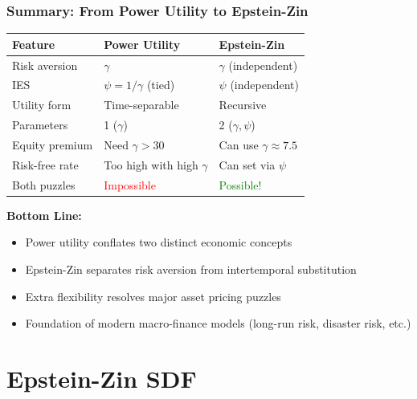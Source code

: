 \documentclass{beamer}
\begin{document}
\begin{frame}
    \frametitle{Summary: From Power Utility to Epstein-Zin}
    
    \begin{table}
        \footnotesize
        \begin{tabular}{p{3cm}|p{3.5cm}|p{3.5cm}}
            \toprule
            \textbf{Feature} & \textbf{Power Utility} & \textbf{Epstein-Zin} \\
            \midrule
            Risk aversion & $\gamma$ & $\gamma$ (independent) \\[0.2cm]
            IES & $\psi = 1/\gamma$ (tied) & $\psi$ (independent) \\[0.2cm]
            Utility form & Time-separable & Recursive \\[0.2cm]
            Parameters & 1 ($\gamma$) & 2 ($\gamma, \psi$) \\[0.2cm]
            Equity premium & Need $\gamma > 30$ & Can use $\gamma \approx 7.5$ \\[0.2cm]
            Risk-free rate & Too high with high $\gamma$ & Can set via $\psi$ \\[0.2cm]
            Both puzzles & \textcolor{red}{Impossible} & \textcolor{green}{Possible!} \\
            \bottomrule
        \end{tabular}
    \end{table}
    
    
    \textbf{Bottom Line:}
    \begin{itemize}
        \item Power utility conflates two distinct economic concepts
        \item Epstein-Zin separates risk aversion from intertemporal substitution
        \item Extra flexibility resolves major asset pricing puzzles
        \item Foundation of modern macro-finance models (long-run risk, disaster risk, etc.)
    \end{itemize}
\end{frame}

\section{Epstein-Zin SDF}
\end{document}
